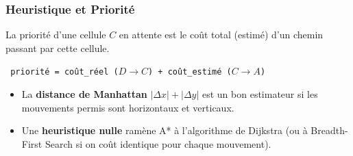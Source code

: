 \documentclass[]{beamer}
\begin{document}
\begin{frame}
  \frametitle{Heuristique et Priorité}
  La priorité d'une cellule $C$ en attente est le coût total (estimé) d'un
  chemin passant par cette cellule.
  \begin{center}\texttt{
    priorité = coût\_réel ($D \rightarrow C$) + coût\_estimé ($C\rightarrow A$)}
  \end{center}
  \medskip
  \begin{itemize}
  \item<3->{La \textbf{distance de Manhattan} $|\Delta x| + |\Delta y|$ est un bon estimateur 
  si les mouvements permis sont horizontaux et verticaux.}
  \par
  \item<4->{Une \textbf{heuristique nulle} ramène A* à l'algorithme de Dijkstra 
  (ou à Breadth-First Search si on coût identique pour chaque mouvement).}
  \end{itemize}
\end{frame}
\end{document}

